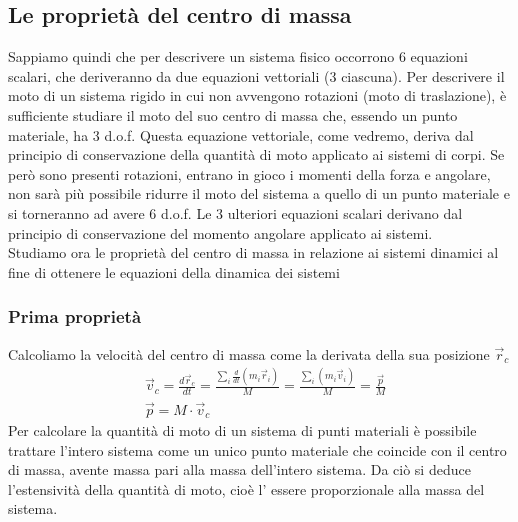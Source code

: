 \documentclass[10pt,a4paper]{article}
\begin{document}
\subsection{Le proprietà del centro di massa}
Sappiamo quindi che per descrivere un sistema fisico occorrono 6 equazioni scalari, che deriveranno da due equazioni vettoriali (3 ciascuna). Per descrivere il moto di un sistema rigido in cui non avvengono rotazioni (moto di traslazione), è sufficiente studiare il moto del suo centro di massa che, essendo un punto materiale, ha 3 d.o.f. Questa equazione vettoriale, come vedremo, deriva dal principio di conservazione della quantità di moto applicato ai sistemi di corpi. Se però sono presenti rotazioni, entrano in gioco i momenti della forza e angolare, non sarà più possibile ridurre il moto del sistema a quello di un punto materiale e si torneranno ad avere 6 d.o.f. Le 3 ulteriori equazioni scalari derivano dal principio di conservazione del momento angolare applicato ai sistemi.\\
Studiamo ora le proprietà del centro di massa in relazione ai sistemi dinamici al fine di ottenere le equazioni della dinamica dei sistemi
\subsubsection{Prima proprietà}
Calcoliamo la velocità del centro di massa come la derivata della sua posizione $\vec{r}_c$
\begin{align*}
&\vec{v}_c = \frac{d\vec{r}_c}{dt}=\frac{\sum_{i}\frac{d}{dt}(m_i \vec{r}_i)}{M}=\frac{\sum_{i}(m_i \vec{v}_i)}{M}=\frac{\vec{p}}{M}\\
&\vec{p} = M \cdot \vec{v}_c
\end{align*}
Per calcolare la quantità di moto di un sistema di punti materiali è possibile trattare l'intero sistema come un unico punto materiale che coincide con il centro di massa, avente massa pari alla massa dell'intero sistema. Da ciò si deduce l'estensività della quantità di moto, cioè l' essere proporzionale alla massa del sistema.
\end{document}
